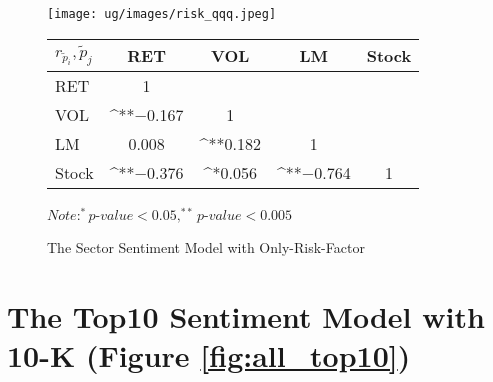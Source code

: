 \documentclass[logo,bsc,singlespacing,parskip]{infthesis}
\begin{document}
\begin{figure}[h]
\centering
\begin{minipage}{0.90\textwidth}
    \centering
    \texttt{[image: ug/images/risk\_qqq.jpeg]}
    \caption{The Sector Sentiment Model with Only-Risk-Factor}
    \label{fig:risk_qqq}
\end{minipage}%
\hfill
\vspace{10pt} %
\begin{minipage}{0.9\textwidth}
    \begin{minipage}[p]{0.9\textwidth}
    \centering
    \begin{tabular}{lcccc}
    \label{tab:risk_qqq_corr}
    $r_\tilde{p}_i,\tilde{p}_j$      & RET       & VOL       & LM        & Stock    \\ \hline
    RET    & 1  &   &  &  \\
    VOL    & ^{**}$-$0.167   & 1  &  &   \\
    LM    & 0.008 & ^{**}0.182 & 1  &  \\
    Stock  & ^{**}$-$0.376 & ^{*}0.056  & ^{**}$-$0.764 & 1  \\ \hline
    \end{tabular}
    \medskip
    $\textit{Note}: ^{*}p$-$value<0.05, ^{**}p$-$value<0.005$
    \end{minipage}
\end{minipage}
\end{figure}


\section{The Top10 Sentiment Model with 10-K  (Figure \ref{fig:all_top10})}
\label{appendix_corr_all_top10}
\end{document}
